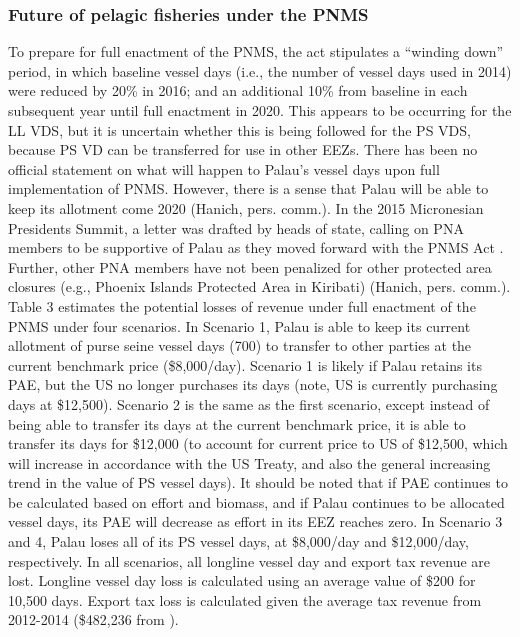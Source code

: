 \documentclass[9pttwoside,lineno]{pnas-new}
\begin{document}
\subsubsection{Future of pelagic fisheries under the PNMS}

To prepare for full enactment of the PNMS, the act stipulates a “winding down” period, in which baseline vessel days (i.e., the number of vessel days used in 2014) were reduced by 20\% in 2016; and an additional 10\% from baseline in each subsequent year until full enactment in 2020. This appears to be occurring for the LL VDS, but it is uncertain whether this is being followed for the PS VDS, because PS VD can be transferred for use in other EEZs. There has been no official statement on what will happen to Palau’s vessel days upon full implementation of PNMS. However, there is a sense that Palau will be able to keep its allotment come 2020 (Hanich, pers. comm.). In the 2015 Micronesian Presidents Summit, a letter was drafted by heads of state, calling on PNA members to be supportive of Palau as they moved forward with the PNMS Act \citep{Senase2015}. Further, other PNA members have not been penalized for other protected area closures (e.g., Phoenix Islands Protected Area in Kiribati) (Hanich, pers. comm.).
Table 3 estimates the potential losses of revenue under full enactment of the PNMS under four scenarios. In Scenario 1, Palau is able to keep its current allotment of purse seine vessel days (700) to transfer to other parties at the current benchmark price (\$8,000/day). Scenario 1 is likely if Palau retains its PAE, but the US no longer purchases its days (note, US is currently purchasing days at \$12,500). Scenario 2 is the same as the first scenario, except instead of being able to transfer its days at the current benchmark price, it is able to transfer its days for \$12,000 (to account for current price to US of \$12,500, which will increase in accordance with the US Treaty, and also the general increasing trend in the value of PS vessel days). It should be noted that if PAE continues to be calculated based on effort and biomass, and if Palau continues to be allocated vessel days, its PAE will decrease as effort in its EEZ reaches zero. In Scenario 3 and 4, Palau loses all of its PS vessel days, at \$8,000/day and \$12,000/day, respectively. In all scenarios, all longline vessel day and export tax revenue are lost. Longline vessel day loss is calculated using an average value of \$200 for 10,500 days. Export tax loss is calculated given the average tax revenue from 2012-2014 (\$482,236  from \cite{Gillett2016}). 
\end{document}
